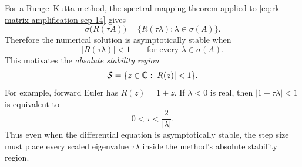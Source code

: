 For a Runge--Kutta method, the spectral mapping theorem applied to
\eqref{eq:rk-matrix-amplification-sep-14} gives
\[
  \sigma\bigl(R(\tau A)\bigr)
  =\bigl\{R(\tau\lambda):\lambda\in\sigma(A)\bigr\}.
\]
Therefore the numerical solution is asymptotically stable when
\begin{equation}\label{eq:rk-eigenvalue-stability-sep-14}
  \lvert R(\tau\lambda)\rvert<1
  \qquad\text{for every }\lambda\in\sigma(A).
\end{equation}
This motivates the \emph{absolute stability region}
\begin{equation}\label{eq:absolute-stability-region-sep-14}
  \mathcal{S}=\{z\in\mathbb{C}:\lvert R(z)\rvert<1\}.
\end{equation}
For example, forward Euler has \(R(z)=1+z\). If \(\lambda<0\) is real,
then \(\lvert1+\tau\lambda\rvert<1\) is equivalent to
\[
  0<\tau<\frac{2}{\lvert\lambda\rvert}.
\]
Thus even when the differential equation is asymptotically stable, the
step size must place every scaled eigenvalue \(\tau\lambda\) inside the
method's absolute stability region.
